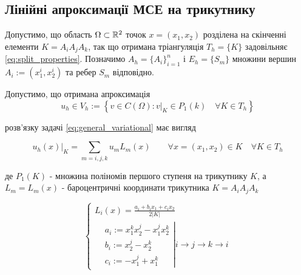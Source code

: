 \subsection{Лінійні апроксимації МСЕ на трикутнику}

Допустимо, що область $\Omega \subset \mathbb{R}^2$ точок $x = (x_1, x_2)$ розділена на скінченні елементи $K = A_iA_jA_k$,
	так що отримана тріангуляція $T_h = \lbrace K \rbrace$ задовільняє
\eqref{eq:split_properties}.
Позначимо $A_h = \lbrace A_i \rbrace_{i=1}^n$ і $E_h = \lbrace S_m \rbrace$ множини вершин $A_i := (x_1^i, x_2^i)$ та ребер $S_m$ відповідно.

Допустимо, що отримана апроксимація
\begin{equation}
	u_h \in V_h := \left\lbrace v \in C(\Omega) : v|_K \in P_1(k) \quad \forall K \in T_h \right\rbrace
\end{equation}

розв'язку задачі
\eqref{eq:general_variational} має вигляд

\begin{equation}
	u_h(x)|_K = \sum \limits_{m=i,j,k} u_m L_m (x) \qquad \forall x=(x_1, x_2) \in K \quad \forall K \in T_h
\end{equation}

де $P_1(K)$ - множина поліномів першого ступеня на трикутнику $K$, а $L_m = L_m(x)$ -
	бароцентричні координати трикутника $K = A_i A_j A_k$

\begin{equation}\label{eq:barycentric_coord}
	\begin{cases}
		L_i(x) = \frac{a_i + b_i x_1 + c_i x_2}{2 |K|} \\
			\left.
			\begin{split}
				&a_i := x_1^k x_2^j - x_1^j x_2^k \\
				&b_i := x_2^j -x_2^k \\
				&c_i := -x_1^j+x_1^k
			\end{split}
			\right|
			i \to j \to k \to i
	\end{cases}
\end{equation}


